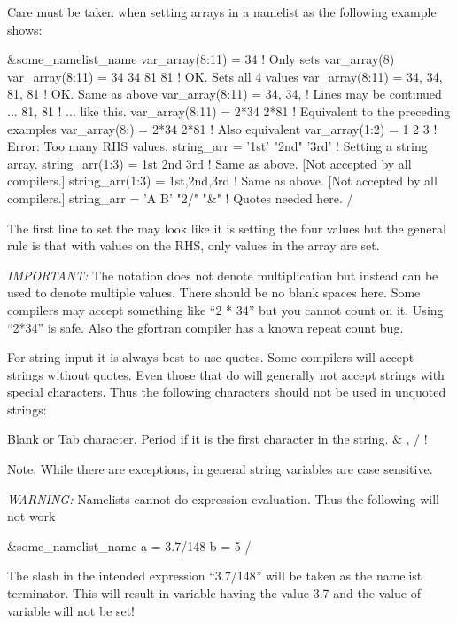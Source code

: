 Care must be taken when setting arrays in a namelist as the following example shows:
\begin{example}
  &some_namelist_name
    var_array(8:11) = 34             ! Only sets var_array(8)
    var_array(8:11) = 34 34 81 81    ! OK. Sets all 4 values
    var_array(8:11) = 34, 34, 81, 81 ! OK. Same as above
    var_array(8:11) = 34, 34,        ! Lines may be continued ...
                      81, 81         !   ... like this.
    var_array(8:11) = 2*34 2*81      ! Equivalent to the preceding examples
    var_array(8:)   = 2*34 2*81      ! Also equivalent
    var_array(1:2) = 1 2 3           ! Error: Too many RHS values.
    string_arr = '1st' "2nd" '3rd'   ! Setting a string array.
    string_arr(1:3) = 1st 2nd 3rd    ! Same as above. [Not accepted by all compilers.]
    string_arr(1:3) = 1st,2nd,3rd    ! Same as above. [Not accepted by all compilers.]
    string_arr = 'A B' "2/" "&"      ! Quotes needed here.
  /
\end{example}
The first line to set the  may look like it is setting the four values
 but the general rule is that with  values on the RHS, only  values
in the array are set.

{\em IMPORTANT:} The notation  does not denote multiplication but instead can be used to
denote multiple values. There should be no blank spaces here. Some compilers may accept something
like ``2 * 34'' but you cannot count on it. Using ``2*34'' is safe. Also the gfortran compiler has a known
repeat count bug.

For string input it is always best to use quotes. Some compilers will accept strings without
quotes. Even those that do will generally not accept strings with special characters.  Thus the
following characters should not be used in unquoted strings:
\begin{example}
  Blank or Tab character.
  Period if it is the first character in the string.
  &   ,   /    !   %
\end{example}
Note: While there are exceptions, in general \tao string variables are
case sensitive.

{\em WARNING:} Namelists cannot do expression evaluation. Thus the following will not work
\begin{example}
  &some_namelist_name
    a = 3.7/148
    b = 5
  /
\end{example}
The slash in the intended expression ``3.7/148'' will be taken as the namelist terminator. This
will result in variable  having the value 3.7 and the value of variable  will not
be set!

